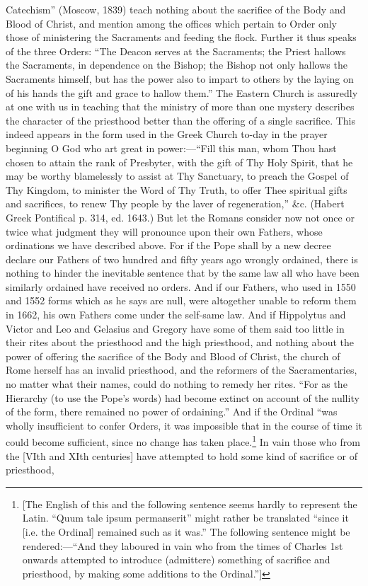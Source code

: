 Catechism” (Moscow, 1839) teach nothing about the sacrifice of the Body and Blood of Christ, and mention among the offices which pertain to Order only those of ministering the Sacraments and feeding the flock. Further it thus speaks of the three Orders: “The Deacon serves at the Sacraments; the Priest hallows the Sacraments, in dependence on the Bishop; the Bishop not only hallows the Sacraments himself, but has the power also to impart to others by the laying on of his hands the gift and grace to hallow them.” The Eastern Church is assuredly at one with us in teaching that the ministry of more than one mystery describes the character of the priesthood better than the offering of a single sacrifice. This indeed appears in the form used in the Greek Church to-day in the prayer beginning O God who art great in power:—“Fill this man, whom Thou hast chosen to attain the rank of Presbyter, with the gift of Thy Holy Spirit, that he may be worthy blamelessly to assist at Thy Sanctuary, to preach the Gospel of Thy Kingdom, to minister the Word of Thy Truth, to offer Thee spiritual gifts and sacrifices, to renew Thy people by the laver of regeneration,” \&c. (Habert Greek Pontifical p. 314, ed. 1643.) But let the Romans consider now not once or twice what judgment they will pronounce upon their own Fathers, whose ordinations we have described above. For if the Pope shall by a new decree declare our Fathers of two hundred and fifty years ago wrongly ordained, there is nothing to hinder the inevitable sentence that by the same law all who have been similarly ordained have received no orders. And if our Fathers, who used in 1550 and 1552 forms which as he says are null, were altogether unable to reform them in 1662, his own Fathers come under the self-same law. And if Hippolytus and Victor and Leo and Gelasius and Gregory have some of them said too little in their rites about the priesthood and the high priesthood, and nothing about the power of offering the sacrifice of the Body and Blood of Christ, the church of Rome herself has an invalid priesthood, and the reformers of the Sacramentaries, no matter what their names, could do nothing to remedy her rites. “For as the Hierarchy (to use the Pope’s words) had become extinct on account of the nullity of the form, there remained no power of ordaining.” And if the Ordinal “was wholly insufficient to confer Orders, it was impossible that in the course of time it could become sufficient, since no change has taken place.\footnote{[The English of this and the following sentence seems hardly to represent the Latin. “Quum tale ipsum permanserit” might rather be translated “since it [i.e. the Ordinal] remained such as it was.” The following sentence might be rendered:—“And they laboured in vain who from the times of Charles 1st onwards attempted to introduce (admittere) something of sacrifice and priesthood, by making some additions to the Ordinal.”]} In vain those who from the [VIth and XIth centuries] have attempted to hold some kind of sacrifice or of priesthood,

